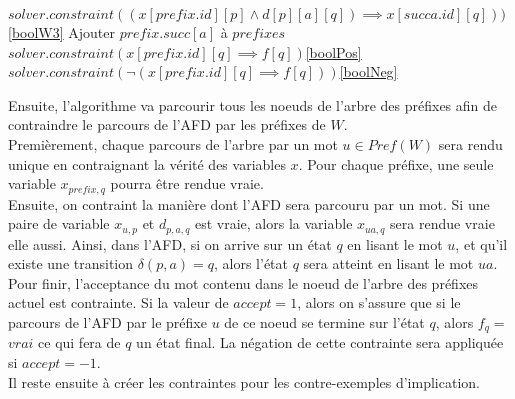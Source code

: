 \documentclass[12pt,a4paper,oneside,titlepage]{report}
\begin{document}
\begin{algorithm}[H]
\begin{algorithmic}[1]
					\State $solver.constraint((x[prefix.id][p]\land d[p][a][q])\implies x[succa.id][q]))$\Comment \ref{boolW3}
				\EndFor
			\EndFor
			\State Ajouter $prefix.succ[a]$ à $prefixes$
		\EndIf
	\EndFor
			\State $solver.constraint(x[prefix.id][q]\implies f[q])$\Comment\ref{boolPos}
		\EndFor
			\State $solver.constraint(\neg(x[prefix.id][q]\implies f[q]))$\Comment \ref{boolNeg}
		\EndFor
	\EndIf
\EndWhile
{}
\end{algorithmic}
\end{algorithm}
\noindent Ensuite, l'algorithme va parcourir tous les noeuds de l'arbre des préfixes afin de contraindre le parcours de l'AFD par les préfixes de $W$.\\
Premièrement, chaque parcours de l'arbre par un mot $u\in Pref(W)$ sera rendu unique en contraignant la vérité des variables $x$. Pour chaque préfixe, une seule variable $x_{prefix, q}$ pourra être rendue vraie.\\
Ensuite, on contraint la manière dont l'AFD sera parcouru par un mot. Si une paire de variable $x_{u,p}$ et $d_{p,a,q}$  est vraie, alors la variable $x_{ua,q}$ sera rendue vraie elle aussi. Ainsi, dans l'AFD, si on arrive sur un état $q$ en lisant le mot $u$, et qu'il existe une transition $\delta(p,a)=q$, alors l'état $q$ sera atteint en lisant le mot $ua$.\\
Pour finir, l'acceptance du mot contenu dans le noeud de l'arbre des préfixes actuel est contrainte. Si la valeur de $accept=1$, alors on s'assure que si le parcours de l'AFD par le préfixe $u$ de ce noeud se termine sur l'état $q$, alors $f_q=$ $vrai$ ce qui fera de $q$ un état final. La négation de cette contrainte sera appliquée si $accept=-1$.\\

\noindent Il reste ensuite à créer les contraintes pour les contre-exemples d'implication.
\end{document}
